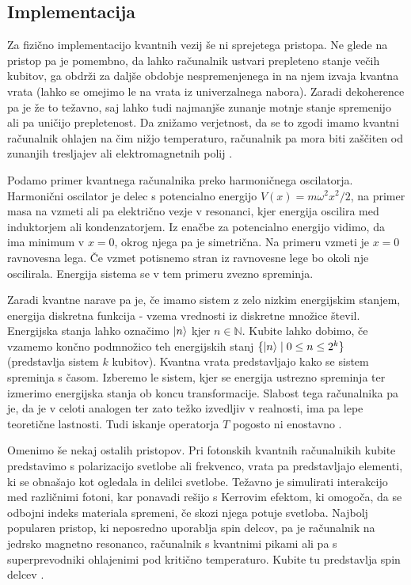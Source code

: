 \documentclass[mat1]{fmfdelo}
\newcommand{\N}{\mathbb N}
\begin{document}
\subsection{Implementacija}
Za fizično implementacijo kvantnih vezij še ni sprejetega pristopa. Ne glede na pristop pa je pomembno, da lahko računalnik ustvari prepleteno stanje večih kubitov, ga obdrži za daljše obdobje nespremenjenega in na njem izvaja kvantna vrata (lahko se omejimo le na vrata iz univerzalnega nabora). Zaradi dekoherence pa je že to težavno, saj lahko tudi najmanjše zunanje motnje stanje spremenijo ali pa uničijo prepletenost. Da znižamo verjetnost, da se to zgodi imamo kvantni računalnik ohlajen na čim nižjo temperaturo, računalnik pa mora biti zaščiten od zunanjih tresljajev ali elektromagnetnih polij \cite[Poglavje 7.2]{nielsen}. 

Podamo primer kvantnega računalnika preko harmoničnega oscilatorja. Harmonični oscilator je delec s potencialno energijo \(V(x)=m\omega^2x^2/2\), na primer masa na vzmeti ali pa električno vezje v resonanci, kjer energija oscilira med induktorjem ali kondenzatorjem. Iz enačbe za potencialno energijo vidimo, da ima minimum v \(x=0\), okrog njega pa je simetrična. Na primeru vzmeti je \(x=0\) ravnovesna lega. Če vzmet potisnemo stran iz ravnovesne lege bo okoli nje oscilirala. Energija sistema se v tem primeru zvezno spreminja.

Zaradi kvantne narave pa je, če imamo sistem z zelo nizkim energijskim stanjem, energija diskretna funkcija - vzema vrednosti iz diskretne množice števil. Energijska stanja lahko označimo \(\ket{n}\) kjer \(n\in \N\). Kubite lahko dobimo, če vzamemo končno podmnožico teh energijskih stanj \(\{\ket{ n } \mid 0\leq n \leq 2^k\}\) (predstavlja sistem \(k\) kubitov). Kvantna vrata predstavljajo kako se sistem spreminja s časom. Izberemo le sistem, kjer se energija ustrezno spreminja ter izmerimo energijska stanja ob koncu transformacije. Slabost tega računalnika pa je, da je v celoti analogen ter zato težko izvedljiv v realnosti, ima pa lepe teoretične lastnosti. Tudi iskanje operatorja \(T\) pogosto ni enostavno \cite[Poglavje 7.3]{nielsen}.

Omenimo še nekaj ostalih pristopov. Pri fotonskih kvantnih računalnikih kubite predstavimo s polarizacijo svetlobe ali frekvenco, vrata pa predstavljajo elementi, ki se obnašajo kot ogledala in delilci svetlobe. Težavno je simulirati interakcijo med različnimi fotoni, kar ponavadi rešijo s Kerrovim efektom, ki omogoča, da se odbojni indeks materiala spremeni, če skozi njega potuje svetloba. Najbolj popularen pristop, ki neposredno uporablja spin delcov, pa je računalnik na jedrsko magnetno resonanco, računalnik s kvantnimi pikami ali pa s superprevodniki ohlajenimi pod kritično temperaturo. Kubite tu predstavlja spin delcev \cite{adamowski}.
\end{document}
